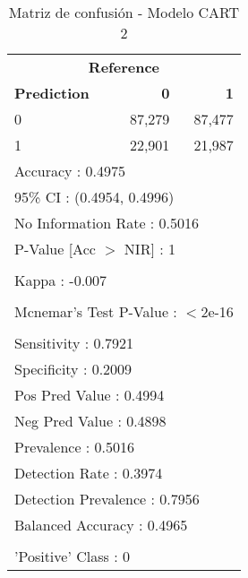 \begin{table}[htbp]
\centering
\caption{Matriz de confusión - Modelo CART 2}
\label{tab:11_matriz_2_cart}
\begin{tabular}{lrr}
\toprule
\multicolumn{3}{c}{\textbf{Reference}} \\
\textbf{Prediction} & \textbf{0} & \textbf{1} \\
\midrule
0 & 87,279 & 87,477 \\
1 & 22,901 & 21,987 \\
\midrule
\multicolumn{3}{l}{Accuracy : 0.4975} \\
\multicolumn{3}{l}{95\% CI : (0.4954, 0.4996)} \\
\multicolumn{3}{l}{No Information Rate : 0.5016} \\
\multicolumn{3}{l}{P-Value [Acc $>$ NIR] : 1} \\
\\
\multicolumn{3}{l}{Kappa : -0.007} \\
\\
\multicolumn{3}{l}{Mcnemar's Test P-Value : $<$2e-16} \\
\\
\multicolumn{3}{l}{Sensitivity : 0.7921} \\
\multicolumn{3}{l}{Specificity : 0.2009} \\
\multicolumn{3}{l}{Pos Pred Value : 0.4994} \\
\multicolumn{3}{l}{Neg Pred Value : 0.4898} \\
\multicolumn{3}{l}{Prevalence : 0.5016} \\
\multicolumn{3}{l}{Detection Rate : 0.3974} \\
\multicolumn{3}{l}{Detection Prevalence : 0.7956} \\
\multicolumn{3}{l}{Balanced Accuracy : 0.4965} \\
\\
\multicolumn{3}{l}{'Positive' Class : 0} \\
\bottomrule
\end{tabular}
\end{table}
